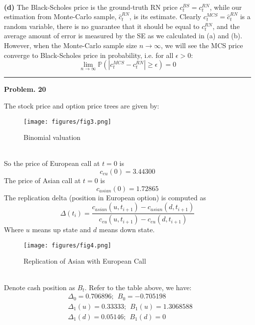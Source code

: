 \documentclass[10 pt]{hwtemplate} %
\begin{document}
\begin{solution}
\begin{figure}[H]
\end{figure}
~\\
\textbf{(d)} The Black-Scholes price is the ground-truth RN price $c^{BS}_t = c^{RN}_t$, while our estimation from Monte-Carlo sample, $\hat{c}^{RN}_t$, is its estimate. Clearly $c^{MCS}_t= \hat{c}^{RN}_t$ is a random variable, there is no guarantee that it should be equal to $c^{RN}_t$, and the average amount of error is measured by the SE as we calculated in (a) and (b). \\
However, when the Monte-Carlo sample size $n\to \infty$, we will see the MCS price converge to Black-Scholes price in probability, i.e. for all $\epsilon > 0$:
\begin{equation}
  \lim\limits_{n\rightarrow\infty} \mathbb{P}\left(|c^{MCS}_t - c^{RN}_t| \geq \epsilon\right) = 0
\end{equation}

\end{solution}


\noindent\rule{16cm}{0.4pt}
\textbf{Problem. 20} 
\begin{solution} The stock price and option price trees are given by:

\begin{figure}[H]
  \centering
  \captionsetup{justification=centering}
  \caption{Binomial valuation}
  \texttt{[image: figures/fig3.png]}
\end{figure}
~\\
So the price of European call at $t=0$ is
$$
c_{eu}(0) = 3.44300
$$
The price of Asian call at $t=0$ is
$$
c_{asian}(0) = 1.72865
$$
The replication delta (position in European option) is computed as
$$
\Delta(t_i) = \frac{c_{asian}(u, t_{i+1})-c_{asian}(d, t_{i+1})}{c_{eu}(u, t_{i+1})-c_{eu}(d, t_{i+1})}
$$
Where $u$ means up state and $d$ means down state.
\begin{figure}[H]
  \centering
  \captionsetup{justification=centering}
  \caption{Replication of Asian with European Call}
  \texttt{[image: figures/fig4.png]}
\end{figure}
~\\
Denote cash position as $B_t$. Refer to the table above, we have:
\begin{equation}
  \begin{split}
    &\Delta_0 = 0.706896;~~B_0 = -0.705198 \\
    &\Delta_1(u) = 0.33333;~~B_1(u) = 1.3068588 \\
    &\Delta_1(d) = 0.05146;~~B_1(d) = 0
  \end{split}
\end{equation}
\end{solution}
\end{document}
